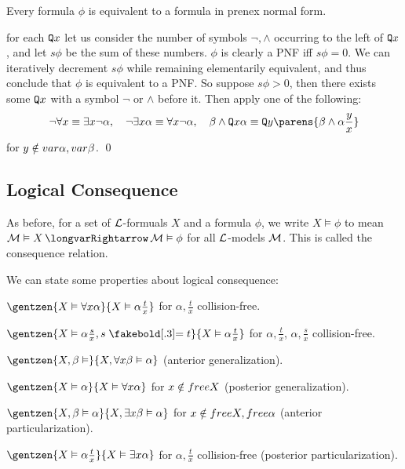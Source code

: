 \edefn

\bthrm

    Every formula $\phi$ is equivalent to a formula in prenex normal form.

\ethrm

\Proof for each ${\tt Q} x$ let us consider the number of symbols $\neg,\land$ occurring to the left of ${\tt Q} x$, and let $s\phi$ be the sum of these numbers.
$\phi$ is clearly a PNF iff $s\phi=0$.
We can iteratively decrement $s\phi$ while remaining elementarily equivalent, and thus conclude that $\phi$ is equivalent to a PNF.
So suppose $s\phi>0$, then there exists some ${\tt Q} x$ with a symbol $\neg$ or $\land$ before it.
Then apply one of the following:
$$ \neg\forall x\equiv\exists x\neg\alpha,\quad \neg\exists x\alpha\equiv\forall x\neg\alpha,\quad \beta\land\Q x\alpha\equiv\Q y\parens{\beta\land\alpha\frac yx} $$
for $y\notin{\sl var}\alpha,{\sl var}\beta$.
\qed

\subsection{Logical Consequence}

\bdefn

    As before, for a set of ${\cal L}$-formuals $X$ and a formula $\phi$, we write $X\vDash\phi$ to mean $\c M\vDash X\implies\c M\vDash\phi$ for all ${\cal L}$-models ${\cal M}$.
    This is called the {\emphcolor consequence relation}.

\edefn

We can state some properties about logical consequence:
\benum
    \item $\gentzen{X\vDash\forall x\alpha}{X\vDash\alpha\frac tx}$ for $\alpha,\frac tx$ collision-free.
    \item $\gentzen{X\vDash\alpha\frac sx,s\eq t}{X\vDash\alpha\frac tx}$ for $\alpha,\frac tx$, $\alpha,\frac sx$ collision-free.
    \item $\gentzen{X,\beta\vDash}{X,\forall x\beta\vDash\alpha}$ (anterior generalization).
    \item $\gentzen{X\vDash\alpha}{X\vDash\forall x\alpha}$ for $x\notin{\sl free} X$ (posterior generalization).
    \item $\gentzen{X,\beta\vDash\alpha}{X,\exists x\beta\vDash\alpha}$ for $x\notin{\sl free} X,{\sl free}\alpha$ (anterior particularization).
    \item $\gentzen{X\vDash\alpha\frac tx}{X\vDash\exists x\alpha}$ for $\alpha,\frac tx$ collision-free (posterior particularization).
\eenum

